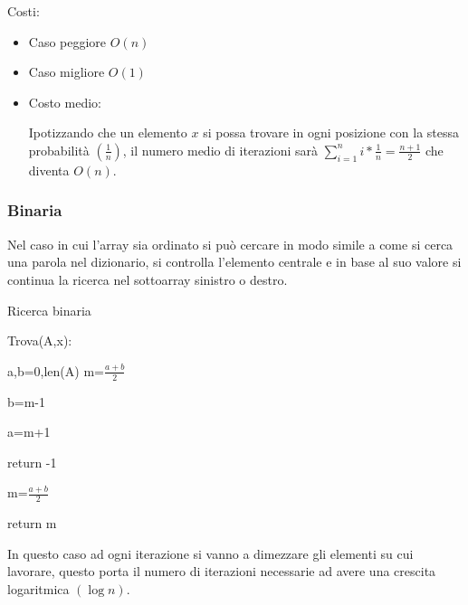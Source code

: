 \documentclass{article}
\begin{document}
\noindent Costi:
\begin{itemize}
    \item Caso peggiore $O(n)$
    \item Caso migliore $O(1)$
    \item Costo medio:

    Ipotizzando che un elemento $x$ si possa trovare in ogni posizione con la stessa probabilità $(\frac{1}{n})$, il numero medio di iterazioni sarà $\sum_{i=1}^ni*\frac{1}{n}=\frac{n+1}{2}$ che diventa $O(n)$.
    
\end{itemize}

\subsubsection{Binaria}

Nel caso in cui l'array sia ordinato si può cercare in modo simile a come si cerca una parola nel dizionario, si controlla l'elemento centrale e in base al suo valore si continua la ricerca nel sottoarray sinistro o destro.

\begin{algorithm}[ht]
\caption{Ricerca binaria}
\begin{algorithmic}
\State Trova(A,x):

    \State a,b=0,len(A) 
    \State m=$\frac{a+b}{2}$ 



            \State b=m-1 

        \Else

            \State a=m+1

        \EndIf


            \State return -1

        \EndIf

        \State m=$\frac{a+b}{2}$ 

    \EndWhile

\State return m

\end{algorithmic}
\end{algorithm}

\noindent In questo caso ad ogni iterazione
si vanno a dimezzare gli elementi su cui lavorare, questo porta il numero di iterazioni necessarie ad avere una crescita logaritmica $(\log n)$.\newline
\end{document}
